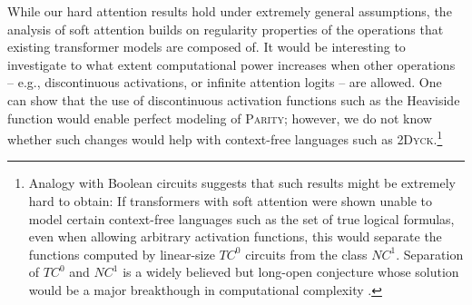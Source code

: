 \documentclass[11pt,a4paper]{article}
\begin{document}
While our hard attention results hold under extremely general assumptions, the analysis of soft attention builds on regularity properties of the operations that existing transformer models are composed of.
It would be interesting to investigate to what extent computational power increases when other operations -- e.g., discontinuous activations, or infinite attention logits -- are allowed.
One can show that the use of discontinuous activation functions such as the Heaviside function would enable perfect modeling of \textsc{Parity}; however, we do not know whether such changes would help with context-free languages such as \textsc{2Dyck}.\footnote{Analogy with Boolean circuits suggests that such results might be extremely hard to obtain: If transformers with soft attention were shown unable to model certain context-free languages such as the set of true logical formulas, even when allowing arbitrary activation functions, this would separate the functions computed by linear-size $TC^0$ circuits from the class $NC^1$. Separation of $TC^0$ and $NC^1$ is a widely believed but long-open conjecture whose solution would be a major breakthough in computational complexity \cite{arora2009computational}.}







\end{document}
